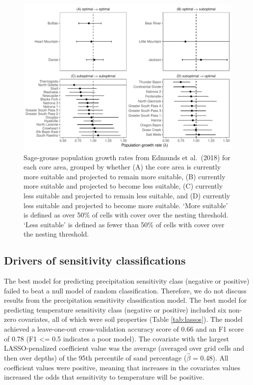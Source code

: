 \documentclass[
  12pt,
]{article}
\begin{document}
\begin{figure}
\centering
\includegraphics{sageCastManuscript_files/figure-latex/lambda-compares-1.pdf}
\caption{\label{fig:lambda-compares}Sage-grouse population growth rates from Edmunds et al.~(2018) for each core area, grouped by whether (A) the core area is currently more suitable and projected to remain more suitable, (B) currently more suitable and projected to become less suitable, (C) currently less suitable and projected to remain less suitable, and (D) currently less suitable and projected to become more suitable. `More suitable' is defined as over 50\% of cells with cover over the nesting threshold. `Less suitable' is defined as fewer than 50\% of cells with cover over the nesting threshold.}
\end{figure}

\hypertarget{drivers-of-sensitivity-classifications}{%
\subsection{Drivers of sensitivity classifications}\label{drivers-of-sensitivity-classifications}}

The best model for predicting precipitation sensitivity class (negative or positive) failed to beat a null model of random classification.
Therefore, we do not discuss results from the precipitation sensitivity classification model.
The best model for predicting temperature sensitivity class (negative or positive) included six non-zero covariates, all of which were soil properties (Table \ref{tab:lassos}).
The model achieved a leave-one-out cross-validation accuracy score of 0.66 and an F1 score of 0.78 (F1 \textless= 0.5 indicates a poor model).
The covariate with the largest LASSO-penalized coefficient value was the average (averaged over grid cells and then over depths) of the 95th percentile of sand percentage (\(\hat{\beta}\) = 0.48).
All coefficient values were positive, meaning that increases in the covariates values increased the odds that sensitivity to temperature will be positive.
\end{document}
